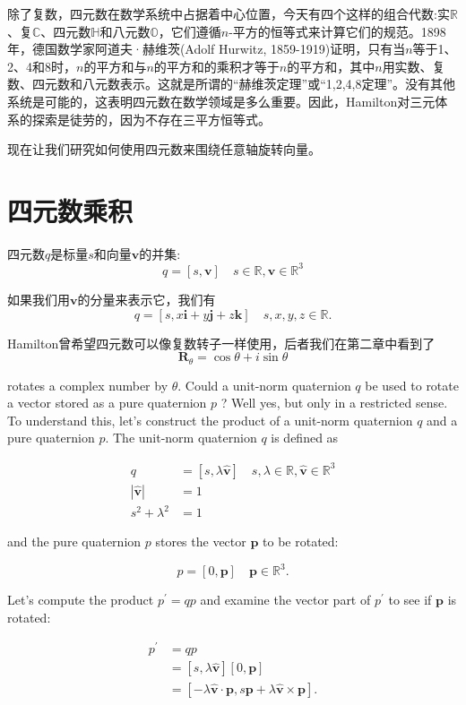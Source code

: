 除了复数，四元数在数学系统中占据着中心位置，今天有四个这样的组合代数:实$\mathbb{R}$、复$\mathbb{C}$、四元数$\mathbb{H}$和八元数$\mathbb{O}$，它们遵循$n$-平方的恒等式来计算它们的规范。1898年，德国数学家阿道夫·赫维茨(Adolf Hurwitz, 1859-1919)证明，只有当$n$等于1、2、4和8时，$n$的平方和与$n$的平方和的乘积才等于$n$的平方和，其中$n$用实数、复数、四元数和八元数表示。这就是所谓的“赫维茨定理”或“1,2,4,8定理”。没有其他系统是可能的，这表明四元数在数学领域是多么重要。因此，Hamilton对三元体系的探索是徒劳的，因为不存在三平方恒等式。

现在让我们研究如何使用四元数来围绕任意轴旋转向量。

\section{四元数乘积}
四元数$q$是标量$s$和向量$\mathbf{v}$的并集:
$$
q=[s, \mathbf{v}] \quad s \in \mathbb{R}, \mathbf{v} \in \mathbb{R}^{3}
$$

如果我们用$\mathbf{v}$的分量来表示它，我们有
$$
q=[s, x \mathbf{i}+y \mathbf{j}+z \mathbf{k}] \quad s, x, y, z \in \mathbb{R} .
$$

Hamilton曾希望四元数可以像复数转子一样使用，后者我们在第二章中看到了
$$
\mathbf{R}_{\theta}=\cos \theta+i \sin \theta
$$

rotates a complex number by $\theta$. Could a unit-norm quaternion $q$ be used to rotate a vector stored as a pure quaternion $p$ ? Well yes, but only in a restricted sense. To understand this, let's construct the product of a unit-norm quaternion $q$ and a pure quaternion $p$. The unit-norm quaternion $q$ is defined as

$$
\begin{aligned}
q & =[s, \lambda \hat{\mathbf{v}}] \quad s, \lambda \in \mathbb{R}, \hat{\mathbf{v}} \in \mathbb{R}^{3} \\
|\hat{\mathbf{v}}| & =1 \\
s^{2}+\lambda^{2} & =1
\end{aligned}
$$

and the pure quaternion $p$ stores the vector $\mathbf{p}$ to be rotated:

$$
p=[0, \mathbf{p}] \quad \mathbf{p} \in \mathbb{R}^{3} .
$$

Let's compute the product $p^{\prime}=q p$ and examine the vector part of $p^{\prime}$ to see if $\mathbf{p}$ is rotated:

$$
\begin{aligned}
p^{\prime} & =q p \\
& =[s, \lambda \hat{\mathbf{v}}][0, \mathbf{p}] \\
& =[-\lambda \hat{\mathbf{v}} \cdot \mathbf{p}, s \mathbf{p}+\lambda \hat{\mathbf{v}} \times \mathbf{p}] .
\end{aligned}
$$

